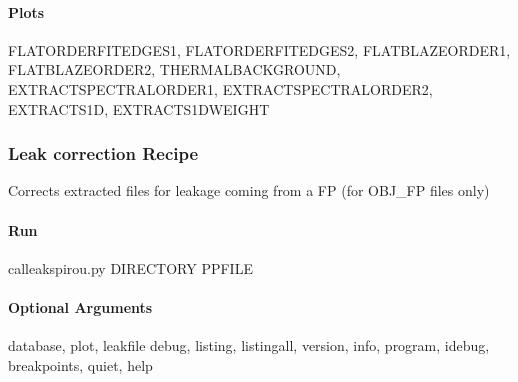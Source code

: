 \documentclass[a4paper,10pt,english]{report}
\begin{document}
\paragraph{Plots}
\label{\detokenize{user/spirou/recipes/extraction:plots}}
\begin{sphinxVerbatim}[commandchars=\\\{\}]
FLAT\PYGZus{}ORDER\PYGZus{}FIT\PYGZus{}EDGES1, FLAT\PYGZus{}ORDER\PYGZus{}FIT\PYGZus{}EDGES2, FLAT\PYGZus{}BLAZE\PYGZus{}ORDER1,
FLAT\PYGZus{}BLAZE\PYGZus{}ORDER2, THERMAL\PYGZus{}BACKGROUND, EXTRACT\PYGZus{}SPECTRAL\PYGZus{}ORDER1,
EXTRACT\PYGZus{}SPECTRAL\PYGZus{}ORDER2, EXTRACT\PYGZus{}S1D, EXTRACT\PYGZus{}S1D\PYGZus{}WEIGHT
\end{sphinxVerbatim}


\subsubsection{Leak correction Recipe}
\label{\detokenize{user/spirou/recipes/leak_corr:leak-correction-recipe}}\label{\detokenize{user/spirou/recipes/leak_corr:recipes-spirou-leak-corr}}\label{\detokenize{user/spirou/recipes/leak_corr::doc}}
Corrects extracted files for leakage coming from a FP (for OBJ\_FP files only)


\paragraph{Run}
\label{\detokenize{user/spirou/recipes/leak_corr:run}}
\begin{sphinxVerbatim}[commandchars=\\\{\}]
cal\PYGZus{}leak\PYGZus{}spirou.py \PYG{o}{[}DIRECTORY\PYG{o}{]} \PYG{o}{[}PP\PYGZus{}FILE\PYG{o}{]}
\end{sphinxVerbatim}


\paragraph{Optional Arguments}
\label{\detokenize{user/spirou/recipes/leak_corr:optional-arguments}}
\begin{sphinxVerbatim}[commandchars=\\\{\}]
\PYGZhy{}\PYGZhy{}database, \PYGZhy{}\PYGZhy{}plot, \PYGZhy{}\PYGZhy{}leakfile
\PYGZhy{}\PYGZhy{}debug, \PYGZhy{}\PYGZhy{}listing, \PYGZhy{}\PYGZhy{}listingall, \PYGZhy{}\PYGZhy{}version, \PYGZhy{}\PYGZhy{}info,
\PYGZhy{}\PYGZhy{}program, \PYGZhy{}\PYGZhy{}idebug, \PYGZhy{}\PYGZhy{}breakpoints, \PYGZhy{}\PYGZhy{}quiet, \PYGZhy{}\PYGZhy{}help
\end{sphinxVerbatim}
\end{document}
